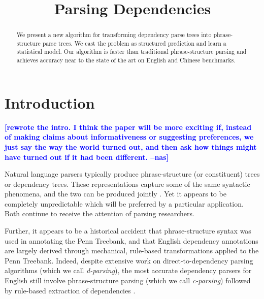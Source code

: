 \documentclass[11pt,letterpaper]{article}
\title{Parsing Dependencies}
\author{}
\date{}
\newcommand{\nascomment}[1]{\textcolor{blue}{\bf \small [#1 --nas]}}
\begin{document}
\maketitle
\begin{abstract}
We present a new algorithm for transforming dependency parse trees into
phrase-structure parse trees.  We cast the problem as  structured
prediction and learn a statistical model.  Our algorithm is faster than traditional
phrase-structure parsing and achieves accuracy near to the state of
the art on English and Chinese benchmarks.




\end{abstract}

\section{Introduction}

\nascomment{rewrote the intro.  I think the paper will be more
  exciting if, instead of making claims about informativeness or
  suggesting preferences, we just say the way the world turned out, and then
  ask how things might have turned out if it had been different.}

Natural language parsers typically produce phrase-structure (or
constituent) trees or dependency trees.  These representations capture
some of the same syntactic phenomena, and the two can be produced
jointly \cite{carreras2008tag,rush2010dual}.  Yet it
appears to be completely unpredictable which will be preferred by a
particular application.  Both continue to receive the attention of
parsing researchers.


Further, it appears to be a historical accident that phrase-structure
syntax was used in annotating the Penn Treebank, and that English
dependency annotations are largely derived through mechanical,
rule-based transformations applied to the Penn Treebank.  Indeed,
despite extensive work on direct-to-dependency parsing algorithms
(which we call \emph{d-parsing}), the most accurate dependency
parsers for English still involve phrase-structure parsing (which we
call \emph{c-parsing}) followed by rule-based extraction of
dependencies \cite{kong2014empirical}.
\end{document}
